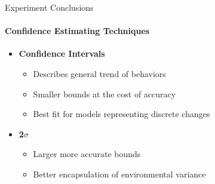 \documentclass{beamer}
\begin{document}
\begin{frame}[t]{Experiment Conclusions}
  \framesubtitle{Confidence Estimating Techniques}
  \vspace*{-.25cm}
  \setlength\itemsep{1.25em}

  \begin{itemize}
    \item \textbf{Confidence Intervals}
      \begin{itemize}
        \item Describes general trend of behaviors
        \item Smaller bounds at the cost of accuracy
        \item Best fit for models representing discrete changes
      \end{itemize}

    \item \textbf{2$\sigma$}
      \begin{itemize}
        \item Larger more accurate bounds
        \item Better encapsulation of environmental variance
      \end{itemize}

  \end{itemize}
\end{frame}
\end{document}
